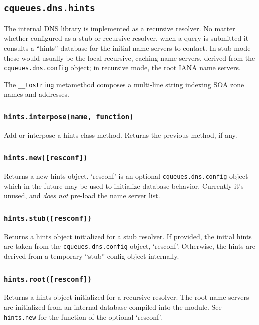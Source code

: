\documentclass[11pt, oneside]{memoir}
\newcommand*{\fn}[1]{\texttt{#1}\xspace}
\newcommand*{\module}[1]{\texttt{#1}\xspace}
\newcounter{toccols}
\newenvironment{Module}[1]{
	\subsection{\texttt{#1}}
	\addtocontents{toc}{
		\protect\begin{multicols}{\value{toccols}}
	}
}{
	\addtocontents{toc}{\protect\end{multicols}}
}
\begin{document}
\begin{Module}{cqueues.dns.hints}

The internal DNS library is implemented as a recursive resolver. No matter whether configured as a stub or recursive resolver, when a query is submitted it consults a ``hints'' database for the initial name servers to contact. In stub mode these would usually be the local recursive, caching name servers, derived from the \module{cqueues.dns.config} object; in recursive mode, the root IANA name servers.

The \fn{\_\_tostring} metamethod composes a multi-line string indexing SOA zone names and addresses.

\subsubsection[\fn{hints.interpose}]{\fn{hints.interpose(name, function)}}

Add or interpose a hints class method. Returns the previous method, if any.

\subsubsection[\fn{hints.new}]{\fn{hints.new([resconf])}}

Returns a new hints object. `resconf' is an optional \module{cqueues.dns.config} object which in the future may be used to initialize database behavior. Currently it's unused, and \emph{does not} pre-load the name server list.

\subsubsection[\fn{hints.stub}]{\fn{hints.stub([resconf])}}

Returns a hints object initialized for a stub resolver. If provided, the initial hints are taken from the \module{cqueues.dns.config} object,  `resconf'. Otherwise, the hints are derived from a temporary ``stub'' config object internally.

\subsubsection[\fn{hints.root}]{\fn{hints.root([resconf])}}

Returns a hints object initialized for a recursive resolver. The root name servers are initialized from an internal database compiled into the module. See \fn{hints.new} for the function of the optional `resconf'.


\end{Module}
\end{document}

